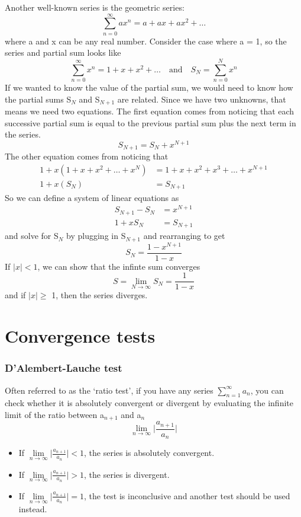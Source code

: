 \documentclass{article}
\newcommand{\be}{\begin{equation}}
\newcommand{\ee}{\end{equation}}
\begin{document}
Another well-known series is the geometric series:
\be
\sum_{n=0}^{\infty} a x^n = a + ax + ax^2 + \hdots
\ee
where a and x can be any real number.
Consider the case where a = 1, so the series and partial sum looks like
\be
\sum_{n=0}^{\infty} x^n = 1 + x + x^2 + \hdots \quad \text{and} \quad S_N = \sum_{n=0}^{N} x^n
\ee
If we wanted to know the value of the partial sum, we would need to know how the partial sums S$_N$ and S$_{N+1}$ are related.
Since we have two unknowns, that means we need two equations.
The first equation comes from noticing that each successive partial sum is equal to the previous partial sum plus the next term in the series.
\be
S_{N+1} = S_N + x^{N+1}
\ee
The other equation comes from noticing that
\be
\begin{split}
1 + x(1 + x + x^2 + \hdots + x^N) &= 1 + x + x^2 + x^3 + \hdots + x^{N+1} \\
1 + x (S_N) &= S_{N+1}
\end{split}
\ee
So we can define a system of linear equations as
\be
\begin{split}
S_{N+1} - S_N &= x^{N+1} \\
1 + xS_N &= S_{N+1}
\end{split}
\ee
and solve for S$_N$ by plugging in S$_{N+1}$ and rearranging to get
\be
S_N = \frac{1-x^{N+1}}{1-x}
\ee
If $|x| < 1$, we can show that the infinte sum converges
\be
S = \lim_{N \to \infty}S_N = \frac{1}{1-x}
\ee
and if $|x|\geq$ 1, then the series diverges.

\section*{Convergence tests}
\subsubsection*{D'Alembert-Lauche test}
Often referred to as the `ratio test', if you have any series $\sum\limits_{n=1}^{\infty} a_n$, you can check whether it is absolutely convergent or divergent by evaluating the infinite limit of the ratio between a$_{n+1}$ and a$_n$
\be
\lim_{n \to \infty} \Big| \frac{a_{n+1}}{a_n} \Big|
\ee
\begin{itemize}
  \item If $\lim\limits_{n \to \infty} \Big| \frac{a_{n+1}}{a_n} \Big| < 1$, the series is absolutely convergent.
  \item If $\lim\limits_{n \to \infty} \Big| \frac{a_{n+1}}{a_n} \Big| > 1$, the series is divergent.
  \item If $\lim\limits_{n \to \infty} \Big| \frac{a_{n+1}}{a_n} \Big| = 1$, the test is inconclusive and another test should be used instead.
\end{itemize}
\end{document}
